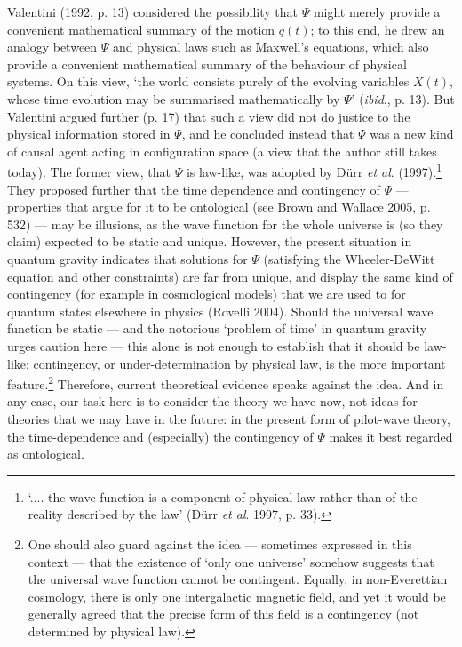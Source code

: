 \documentclass[12pt]{article}%
\begin{document}
Valentini (1992, p. 13) considered the possibility that $\Psi$ might merely
provide a convenient mathematical summary of the motion $q(t)$; to this end,
he drew an analogy between $\Psi$ and physical laws such as Maxwell's
equations, which also provide a convenient mathematical summary of the
behaviour of physical systems. On this view, `the world consists purely of the
evolving variables $X(t)$, whose time evolution may be summarised
mathematically by $\Psi$' (\textit{ibid}., p. 13). But Valentini argued
further (p. 17) that such a view did not do justice to the physical
information stored in $\Psi$, and he concluded instead that $\Psi$ was a new
kind of causal agent acting in configuration space (a view that the author
still takes today). The former view, that $\Psi$ is law-like, was adopted by
D\"{u}rr \textit{et al}. (1997).\footnote{`.... the wave function is a
component of physical law rather than of the reality described by the law'
(D\"{u}rr \textit{et al}. 1997, p. 33).} They proposed further that the time
dependence and contingency of $\Psi$ --- properties that argue for it to be
ontological (see Brown and Wallace 2005, p. 532) --- may be illusions, as the
wave function for the whole universe is (so they claim) expected to be static
and unique. However, the present situation in quantum gravity indicates that
solutions for $\Psi$ (satisfying the Wheeler-DeWitt equation and other
constraints) are far from unique, and display the same kind of contingency
(for example in cosmological models) that we are used to for quantum states
elsewhere in physics (Rovelli 2004). Should the universal wave function be
static --- and the notorious `problem of time' in quantum gravity urges
caution here --- this alone is not enough to establish that it should be
law-like: contingency, or under-determination by physical law, is the more
important feature.\footnote{One should also guard against the idea ---
sometimes expressed in this context --- that the existence of `only one
universe' somehow suggests that the universal wave function cannot be
contingent. Equally, in non-Everettian cosmology, there is only one
intergalactic magnetic field, and yet it would be generally agreed that the
precise form of this field is a contingency (not determined by physical law).}
Therefore, current theoretical evidence speaks against the idea. And in any
case, our task here is to consider the theory we have now, not ideas for
theories that we may have in the future: in the present form of pilot-wave
theory, the time-dependence and (especially) the contingency of $\Psi$ makes
it best regarded as ontological.
\end{document}
